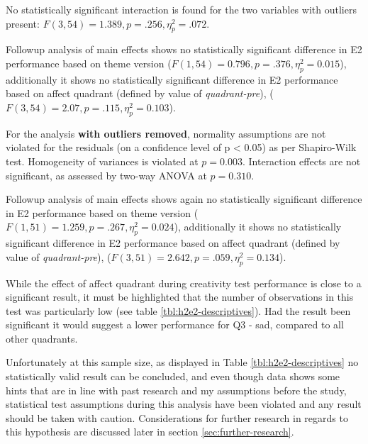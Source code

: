 	No statistically significant interaction is found for the two variables with outliers present: $ F (3, 54) = 1.389, p = .256, \eta_{p}^{2} = .072 $.
	
	Followup analysis of main effects shows 
	no statistically significant difference in E2 performance based on theme version ($ F(1, 54) = 0.796, p = .376, \eta_{p}^{2} = 0.015 $), additionally it shows no statistically significant difference in E2 performance based on affect quadrant (defined by value of \textit{quadrant-pre}), ($ F(3, 54) = 2.07, p = .115, \eta_{p}^{2} = 0.103 $).
	
	For the analysis \textbf{with outliers removed},
	normality assumptions are not violated for the residuals (on a confidence level of p < 0.05) as per Shapiro-Wilk test. Homogeneity of variances is violated at $ p = 0.003 $. Interaction effects are not significant, as assessed by two-way ANOVA at $ p = 0.310 $. 
	
	Followup analysis of main effects shows again
	no statistically significant difference in E2 performance based on theme version ($ F(1, 51) = 1.259, p = .267, \eta_{p}^{2} = 0.024 $), additionally it shows no statistically significant difference in E2 performance based on affect quadrant (defined by value of \textit{quadrant-pre}), ($ F(3, 51) = 2.642, p = .059, \eta_{p}^{2} = 0.134 $).
	
	While the effect of affect quadrant during creativity test performance is close to a significant result, it must be highlighted that the number of observations in this test was particularly low (see table \ref{tbl:h2e2-descriptives}). Had the result been significant it would suggest a lower performance for Q3 - sad, compared to all other quadrants.
	
	
	Unfortunately at this sample size, as displayed in Table \ref{tbl:h2e2-descriptives} no statistically valid result can be concluded, and even though data shows some hints that are in line with past research and my assumptions before the study, statistical test assumptions during this analysis have been violated and any result should be taken with caution. Considerations for further research in regards to this hypothesis are discussed later in section \ref{sec:further-research}.
	
